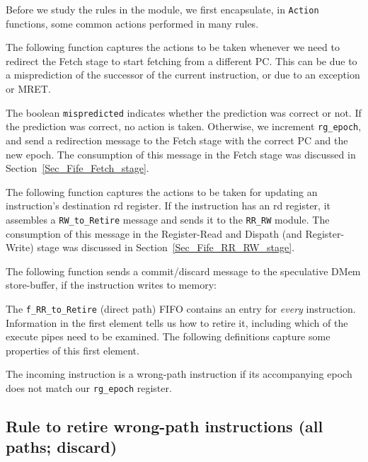 Before we study the rules in the module, we first encapsulate, in
\verb|Action| functions, some common actions performed in many rules.

The following function captures the actions to be taken whenever we
need to redirect the Fetch stage to start fetching from a different
PC.  This can be due to a misprediction of the successor of the
current instruction, or due to an exception or MRET.


The boolean \verb|mispredicted| indicates whether the prediction was
correct or not.  If the prediction was correct, no action is taken.
Otherwise, we increment \verb|rg_epoch|, and send a redirection
message to the Fetch stage with the correct PC and the new epoch.  The
consumption of this message in the Fetch stage was discussed in
Section~\ref{Sec_Fife_Fetch_stage}.

The following function captures the actions to be taken for updating
an instruction's destination rd register. If the instruction has an rd
register, it assembles a \verb|RW_to_Retire| message and sends it to
the \verb|RR_RW| module.  The consumption of this message in the
Register-Read and Dispath (and Register-Write) stage was discussed in
Section~\ref{Sec_Fife_RR_RW_stage}.


The following function sends a commit/discard message to the
speculative DMem store-buffer, if the instruction writes to memory:


The \verb|f_RR_to_Retire| (direct path) FIFO contains an entry for
\emph{every} instruction.  Information in the first element tells us
how to retire it, including which of the execute pipes need to be
examined.  The following definitions capture some properties of this
first element.


The incoming instruction is a wrong-path instruction if its
accompanying epoch does not match our \verb|rg_epoch| register.


\subsection{Rule to retire wrong-path instructions (all paths; discard)}

